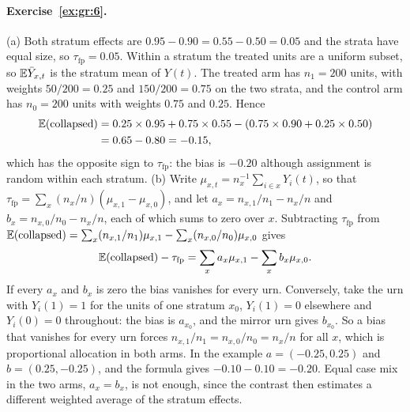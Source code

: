 \paragraph{Exercise~\ref{ex:gr:6}.} (a) Both stratum effects are $0.95-0.90=0.55-0.50=0.05$ and the strata have equal size, so $\tau_{\mathrm{fp}}=0.05$. Within a stratum the treated units are a uniform subset, so $\mathbb{E}\bar Y_{x,t}$ is the stratum mean of $Y(t)$. The treated arm has $n_1=200$ units, with weights $50/200=0.25$ and $150/200=0.75$ on the two strata, and the control arm has $n_0=200$ units with weights $0.75$ and $0.25$. Hence
\[
\begin{aligned}
\mathbb{E}(\text{collapsed})&=0.25\times0.95+0.75\times0.55-(0.75\times0.90+0.25\times0.50)\\
&=0.65-0.80=-0.15,
\end{aligned}
\]
which has the opposite sign to $\tau_{\mathrm{fp}}$: the bias is $-0.20$ although assignment is random within each stratum. (b) Write $\mu_{x,t}=n_x^{-1}\sum_{i\in x}Y_i(t)$, so that $\tau_{\mathrm{fp}}=\sum_x(n_x/n)(\mu_{x,1}-\mu_{x,0})$, and let $a_x=n_{x,1}/n_1-n_x/n$ and $b_x=n_{x,0}/n_0-n_x/n$, each of which sums to zero over $x$. Subtracting $\tau_{\mathrm{fp}}$ from $\mathbb{E}(\text{collapsed})=\sum_x(n_{x,1}/n_1)\mu_{x,1}-\sum_x(n_{x,0}/n_0)\mu_{x,0}$ gives
\[
\mathbb{E}(\text{collapsed})-\tau_{\mathrm{fp}}=\sum_xa_x\mu_{x,1}-\sum_xb_x\mu_{x,0}.
\]
If every $a_x$ and $b_x$ is zero the bias vanishes for every urn. Conversely, take the urn with $Y_i(1)=1$ for the units of one stratum $x_0$, $Y_i(1)=0$ elsewhere and $Y_i(0)=0$ throughout: the bias is $a_{x_0}$, and the mirror urn gives $b_{x_0}$. So a bias that vanishes for every urn forces $n_{x,1}/n_1=n_{x,0}/n_0=n_x/n$ for all $x$, which is proportional allocation in both arms. In the example $a=(-0.25,0.25)$ and $b=(0.25,-0.25)$, and the formula gives $-0.10-0.10=-0.20$. Equal case mix in the two arms, $a_x=b_x$, is not enough, since the contrast then estimates a different weighted average of the stratum effects.

